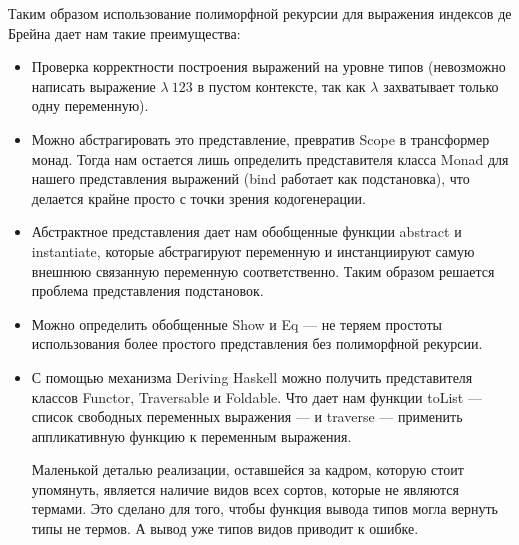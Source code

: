 Таким образом использование полиморфной рекурсии для выражения индексов де Брейна дает нам такие преимущества:
\begin{itemize}
  \item Проверка корректности построения выражений на уровне типов (невозможно написать выражение $\lambda\ 123$ в пустом контексте, так как $\lambda$ захватывает только одну переменную).
  \item Можно абстрагировать это представление, превратив Scope в трансформер монад. Тогда нам остается лишь определить представителя класса Monad для нашего представления выражений (bind работает как подстановка), что делается крайне просто с точки зрения кодогенерации.
  \item Абстрактное представления дает нам обобщенные функции abstract и instantiate, которые абстрагируют переменную и инстанциируют самую внешнюю связанную переменную соответственно. Таким образом решается проблема представления подстановок.
  \item Можно определить обобщенные Show и Eq --- не теряем простоты использования более простого представления без полиморфной рекурсии.
  \item С помощью механизма Deriving Haskell можно получить представителя классов Functor, Traversable и Foldable. Что дает нам функции toList --- список свободных переменных выражения --- и traverse --- применить аппликативную функцию к переменным выражения.

\hfill

Маленькой деталью реализации, оставшейся за кадром, которую стоит упомянуть, является наличие видов всех сортов, которые не являются термами. Это сделано для того, чтобы функция вывода типов могла вернуть типы не термов. А вывод уже типов видов приводит к ошибке. 

\end{itemize}
